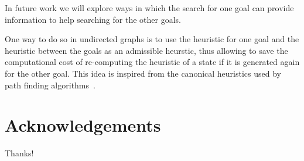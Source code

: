\documentclass{aicom2e}
\begin{document}
In future work we will explore ways in which the search for one goal 
can provide information to help searching for the other goals. 

One way to do so in undirected graphs is to use the heuristic for one goal and the 
heuristic between the goals as an admissible heurstic, thus allowing to save the computational cost of re-computing the heuristic of a state if it is generated again for the other goal. This idea is inspired from the canonical heuristics used by path finding algorithms~\cite{canonical}.




\section*{Acknowledgements}
Thanks!



\end{document}
